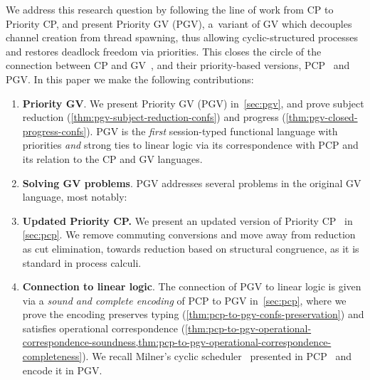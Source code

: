 \documentclass[main.tex]{subfiles}
\begin{document}
We address this research question by following the line of work from CP to Priority CP, and present
Priority GV (PGV), a~variant of GV which decouples channel creation from thread spawning, thus allowing cyclic-structured processes and restores deadlock freedom via priorities. This closes the circle of the connection between CP and GV~\cite{wadler14}, and their priority-based versions, PCP~\cite{dardhagay18} and PGV.
In this paper we make the following contributions:
\begin{enumerate}
\item \textbf{Priority GV}. We present Priority GV (PGV) in~\cref{sec:pgv}, and prove subject reduction (\cref{thm:pgv-subject-reduction-confs}) and progress (\cref{thm:pgv-closed-progress-confs}).
PGV is the \emph{first} session-typed functional language with priorities \emph{and} strong ties to linear logic via its correspondence with PCP and its relation to the CP and GV languages.
\item \textbf{Solving GV problems}. PGV addresses several problems in the original GV language, most notably:
\item \textbf{Updated Priority CP.} We present an updated version of Priority CP~\cite{dardhagay18} in \cref{sec:pcp}. We remove commuting conversions and move away from reduction as cut elimination, towards reduction based on structural congruence, as it is standard in process calculi.
\item \textbf{Connection to linear logic}. The connection of PGV to linear logic is given via a \emph{sound and complete encoding} of PCP to PGV in~\cref{sec:pcp}, where we prove the encoding preserves typing (\cref{thm:pcp-to-pgv-confs-preservation}) and satisfies operational correspondence (\cref{thm:pcp-to-pgv-operational-correspondence-soundness,thm:pcp-to-pgv-operational-correspondence-completeness}). We recall Milner's cyclic scheduler~\cite{milner89} presented in PCP~\cite{dardhagay18} and encode it in PGV.
\end{enumerate}
\end{document}
